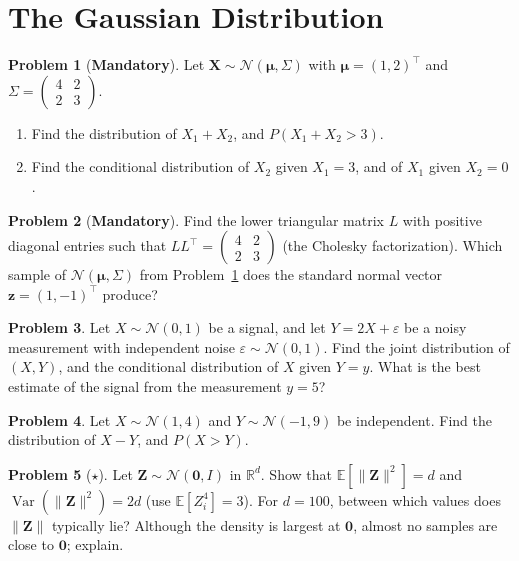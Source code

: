\documentclass[11pt]{article}
\theoremstyle{definition}
\newtheorem{problem}{Problem}[section]
\newcommand{\mandatory}{\textcolor{red!70!black}{\textbf{Mandatory}}}
\newcommand{\norm}[1]{\lVert #1 \rVert}
\newcommand{\E}{\mathbb{E}}
\DeclareMathOperator{\Var}{Var}
\begin{document}
\section{The Gaussian Distribution}

\begin{problem}[\mandatory]\label{pr:gauss-conditional}
    Let $\mathbf{X} \sim \mathcal{N}(\boldsymbol{\mu}, \Sigma)$ with $\boldsymbol{\mu} = (1, 2)^\top$ and $\Sigma = \begin{pmatrix} 4 & 2 \\ 2 & 3 \end{pmatrix}$.
    \begin{enumerate}[label=(\alph*)]
        \item Find the distribution of $X_1 + X_2$, and $P(X_1 + X_2 > 3)$.
        \item Find the conditional distribution of $X_2$ given $X_1 = 3$, and of $X_1$ given $X_2 = 0$.
    \end{enumerate}
\end{problem}

\begin{problem}[\mandatory]\label{pr:cholesky}
    Find the lower triangular matrix $L$ with positive diagonal entries such that $LL^\top = \begin{pmatrix} 4 & 2 \\ 2 & 3 \end{pmatrix}$ (the Cholesky factorization). Which sample of $\mathcal{N}(\boldsymbol{\mu}, \Sigma)$ from Problem~\ref{pr:gauss-conditional} does the standard normal vector $\mathbf{z} = (1, -1)^\top$ produce?
\end{problem}

\begin{problem}\label{pr:denoising}
    Let $X \sim \mathcal{N}(0, 1)$ be a signal, and let $Y = 2X + \varepsilon$ be a noisy measurement with independent noise $\varepsilon \sim \mathcal{N}(0, 1)$. Find the joint distribution of $(X, Y)$, and the conditional distribution of $X$ given $Y = y$. What is the best estimate of the signal from the measurement $y = 5$?
\end{problem}

\begin{problem}\label{pr:gauss-difference}
    Let $X \sim \mathcal{N}(1, 4)$ and $Y \sim \mathcal{N}(-1, 9)$ be independent. Find the distribution of $X - Y$, and $P(X > Y)$.
\end{problem}

\begin{problem}[$\star$]\label{pr:gauss-shell}
    Let $\mathbf{Z} \sim \mathcal{N}(\mathbf{0}, I)$ in $\mathbb{R}^d$. Show that $\E[\norm{\mathbf{Z}}^2] = d$ and $\Var(\norm{\mathbf{Z}}^2) = 2d$ (use $\E[Z_i^4] = 3$). For $d = 100$, between which values does $\norm{\mathbf{Z}}$ typically lie? Although the density is largest at $\mathbf{0}$, almost no samples are close to $\mathbf{0}$; explain.
\end{problem}
\end{document}
